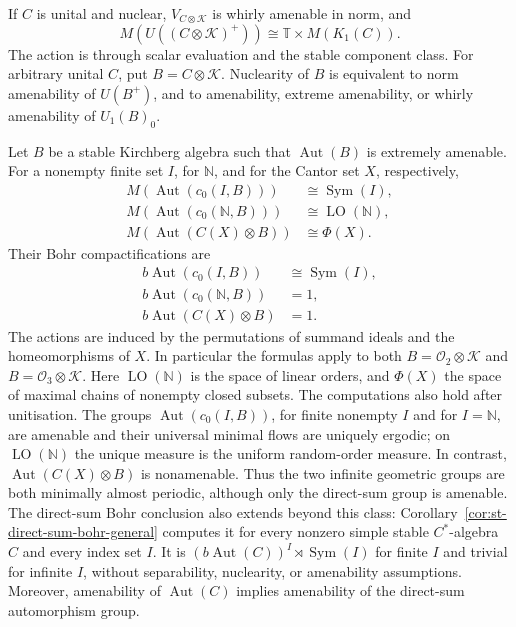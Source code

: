 \begin{theorem}\label{thm:st-nuclear-norm}
If \(C\) is unital and nuclear, \(V_{C\otimes\mathcal K}\) is whirly amenable in
norm, and
\[
 M(U((C\otimes\mathcal K)^+))\cong\mathbb T\times M(K_1(C)).
\]
The action is through scalar evaluation and the stable component class.
For arbitrary unital \(C\), put \(B=C\otimes\mathcal K\). Nuclearity of \(B\) is equivalent to norm
amenability of \(U(B^+)\), and to amenability, extreme amenability, or
whirly amenability of \(U_1(B)_0\).
\end{theorem}

\begin{theorem}\label{thm:st-geometric}
 Let $B$ be a stable Kirchberg algebra such that $\operatorname{Aut} (B)$ is extremely amenable. For a nonempty finite set $I$, for $\mathbb{N}$,
and for the Cantor set $X$, respectively, 
\begin{align*}
M(\operatorname{Aut}(c_0(I,B)))&\cong\operatorname{Sym}(I), \\
M(\operatorname{Aut}(c_0(\mathbb{N},B)))&\cong\operatorname{LO}(\mathbb{N}), \\
M(\operatorname{Aut}(C(X)\otimes B))&\cong\Phi(X).
\end{align*}
Their Bohr compactifications are 
\begin{align*}
b\operatorname{Aut}(c_0(I,B))&\cong\operatorname{Sym}(I), \\
b\operatorname{Aut}(c_0(\mathbb{N},B))&=1, \\
b\operatorname{Aut}(C(X)\otimes B)&=1.
\end{align*}
The actions are induced by the permutations of summand ideals and the
homeomorphisms of $X$. In particular the formulas apply to both $B=\mathcal{O}_2\otimes\mathcal{K}$ and $B=\mathcal{O}_3\otimes\mathcal{K}$. Here $\operatorname{LO}(\mathbb{N})$ is the space of linear orders, and $\Phi(X)$ the space of
maximal chains of nonempty closed subsets. The computations also hold after
unitisation. The groups $\operatorname{Aut}(c_0(I,B))$, for finite nonempty $I$ and for $I=\mathbb{N}$, are amenable and their universal minimal flows are uniquely
ergodic; on $\operatorname{LO}(\mathbb{N})$ the unique measure is the uniform random-order
measure. In contrast, $\operatorname{Aut}(C(X)\otimes B)$ is nonamenable. Thus the two
infinite geometric groups are both minimally almost periodic, although only
the direct-sum group is amenable. The direct-sum Bohr conclusion also extends beyond this class: Corollary~\ref{cor:st-direct-sum-bohr-general}
computes it for every nonzero simple stable $C^*$-algebra $C$ and every index set $I
$. It is $(b\operatorname{Aut}(C))^I\rtimes\operatorname{Sym}(I)$ for finite $I$ and trivial for
infinite $I$, without separability, nuclearity, or amenability assumptions. Moreover, amenability of $\operatorname{Aut}(C)$ implies amenability of the
direct-sum automorphism group.
\end{theorem}

